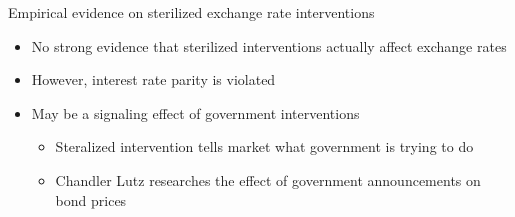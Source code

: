 \documentclass{beamer}
\begin{document}
  
\begin{frame}{Empirical evidence on sterilized exchange rate interventions}

    \begin{itemize}
        \item No strong evidence that sterilized interventions actually affect exchange rates
        \item However, interest rate parity is violated
        \item May be a signaling effect of government interventions
        \begin{itemize}
            \item Steralized intervention tells market what government is trying to do 
            \item Chandler Lutz researches the effect of government announcements on bond prices 
        \end{itemize}
    \end{itemize}

\end{frame}
\end{document}
